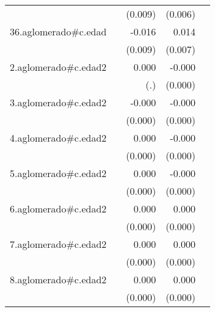 {\begin{longtable}{l*{4}{D{.}{.}{-1}}}
            &                     &     (0.009)         &     (0.006)         &                     \\
\addlinespace
36.aglomerado#c.edad&                     &      -0.016         &       0.014\sym{*}  &                     \\
            &                     &     (0.009)         &     (0.007)         &                     \\
\addlinespace
2.aglomerado#c.edad2&                     &       0.000         &      -0.000\sym{**} &                     \\
            &                     &         (.)         &     (0.000)         &                     \\
\addlinespace
3.aglomerado#c.edad2&                     &      -0.000         &      -0.000\sym{***}&                     \\
            &                     &     (0.000)         &     (0.000)         &                     \\
\addlinespace
4.aglomerado#c.edad2&                     &       0.000         &      -0.000\sym{***}&                     \\
            &                     &     (0.000)         &     (0.000)         &                     \\
\addlinespace
5.aglomerado#c.edad2&                     &       0.000         &      -0.000         &                     \\
            &                     &     (0.000)         &     (0.000)         &                     \\
\addlinespace
6.aglomerado#c.edad2&                     &       0.000\sym{*}  &       0.000         &                     \\
            &                     &     (0.000)         &     (0.000)         &                     \\
\addlinespace
7.aglomerado#c.edad2&                     &       0.000\sym{*}  &       0.000         &                     \\
            &                     &     (0.000)         &     (0.000)         &                     \\
\addlinespace
8.aglomerado#c.edad2&                     &       0.000\sym{*}  &       0.000         &                     \\
            &                     &     (0.000)         &     (0.000)         &                     \\

\end{longtable}}
